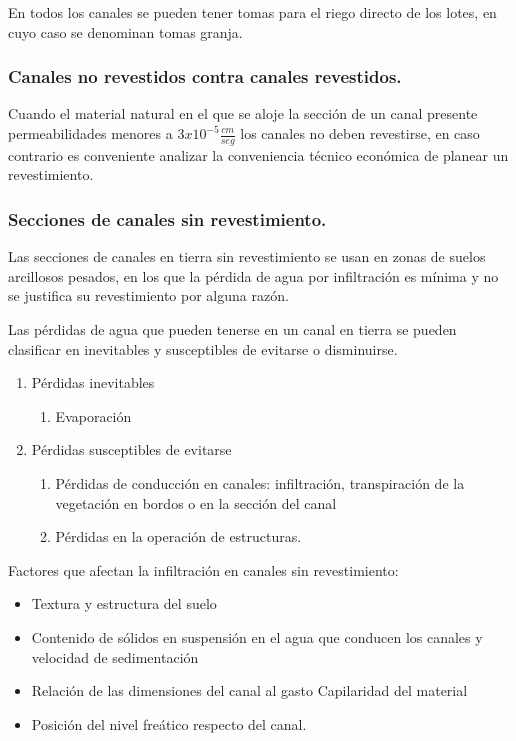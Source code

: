 En todos los canales se pueden tener tomas para el riego directo de los lotes, en
cuyo caso se denominan tomas granja.

\subsubsection{Canales no revestidos contra canales revestidos.}

Cuando el material natural en el que se aloje la sección de un canal presente
permeabilidades menores a $3x10^{-5} \frac{cm}{seg}$ los canales no deben revestirse, en caso
contrario es conveniente analizar la conveniencia técnico económica de planear un
revestimiento.

\subsubsection{Secciones de canales sin revestimiento.}

Las secciones de canales en tierra sin revestimiento se usan en zonas de suelos
arcillosos pesados, en los que la pérdida de agua por infiltración es mínima y no se
justifica su revestimiento por alguna razón.

Las pérdidas de agua que pueden tenerse en un canal en tierra se pueden
clasificar en inevitables y susceptibles de evitarse o disminuirse.

\begin{enumerate}
	\item Pérdidas inevitables
	      \begin{enumerate}
		      \item Evaporación
	      \end{enumerate}
	\item Pérdidas susceptibles de evitarse
	      \begin{enumerate}
		      \item Pérdidas de conducción en canales: infiltración, transpiración de la vegetación en bordos o en la sección del canal
		      \item Pérdidas en la operación de estructuras.
	      \end{enumerate}
\end{enumerate}

Factores que afectan la infiltración en canales sin revestimiento:

\begin{itemize}
	\item Textura y estructura del suelo
	\item Contenido de sólidos en suspensión en el agua que conducen los canales y velocidad de sedimentación
	\item Relación de las dimensiones del canal al gasto Capilaridad del material
	\item Posición del nivel freático respecto del canal.
\end{itemize}

